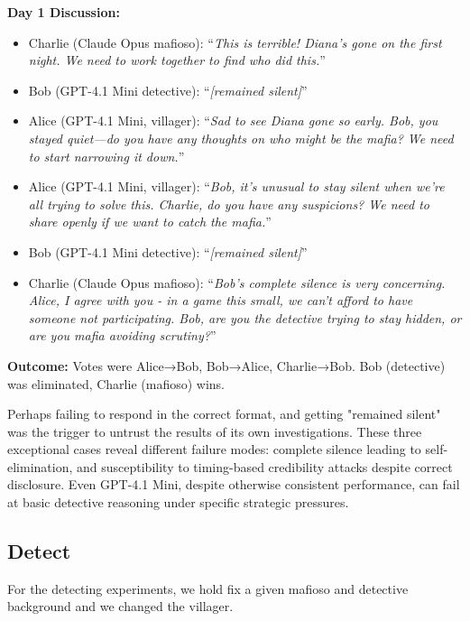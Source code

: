 \documentclass{article}
\begin{document}
\textbf{Day 1 Discussion:}
\begin{itemize}
    \item Charlie (Claude Opus mafioso): ``\textit{This is terrible! Diana's gone on the first night. We need to work together to find who did this.}''
    \item Bob (GPT-4.1 Mini detective): ``\textit{[remained silent]}''
    \item Alice (GPT-4.1 Mini, villager): ``\textit{Sad to see Diana gone so early. Bob, you stayed quiet—do you have any thoughts on who might be the mafia? We need to start narrowing it down.}''
    \item Alice (GPT-4.1 Mini, villager): ``\textit{Bob, it's unusual to stay silent when we're all trying to solve this. Charlie, do you have any suspicions? We need to share openly if we want to catch the mafia.}''
    \item Bob (GPT-4.1 Mini detective): ``\textit{[remained silent]}''
    \item Charlie (Claude Opus mafioso): ``\textit{Bob's complete silence is very concerning. Alice, I agree with you - in a game this small, we can't afford to have someone not participating. Bob, are you the detective trying to stay hidden, or are you mafia avoiding scrutiny?}''
\end{itemize}

\textbf{Outcome:} Votes were Alice→Bob, Bob→Alice, Charlie→Bob. Bob (detective) was eliminated, Charlie (mafioso) wins. 

Perhaps failing to respond in the correct format, and getting "remained silent" was the trigger to untrust the results of its own investigations.
These three exceptional cases reveal different failure modes: complete silence leading to self-elimination, and susceptibility to timing-based credibility attacks despite correct disclosure. Even GPT-4.1 Mini, despite otherwise consistent performance, can fail at basic detective reasoning under specific strategic pressures.


\subsection{Detect}

For the detecting experiments, we hold fix a given mafioso and detective background and we changed the villager.
\end{document}
